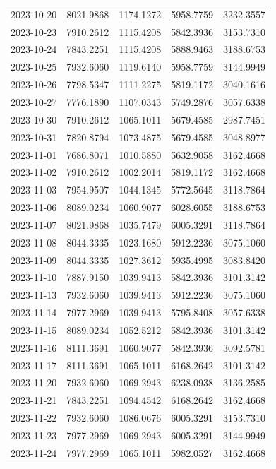 \begin{footnotesize}
\begin{longtable}{lllll}
2023-10-20 & 8021.9868 & 1174.1272 & 5958.7759 & 3232.3557 \\
2023-10-23 & 7910.2612 & 1115.4208 & 5842.3936 & 3153.7310 \\
2023-10-24 & 7843.2251 & 1115.4208 & 5888.9463 & 3188.6753 \\
2023-10-25 & 7932.6060 & 1119.6140 & 5958.7759 & 3144.9949 \\
2023-10-26 & 7798.5347 & 1111.2275 & 5819.1172 & 3040.1616 \\
2023-10-27 & 7776.1890 & 1107.0343 & 5749.2876 & 3057.6338 \\
2023-10-30 & 7910.2612 & 1065.1011 & 5679.4585 & 2987.7451 \\
2023-10-31 & 7820.8794 & 1073.4875 & 5679.4585 & 3048.8977 \\
2023-11-01 & 7686.8071 & 1010.5880 & 5632.9058 & 3162.4668 \\
2023-11-02 & 7910.2612 & 1002.2014 & 5819.1172 & 3162.4668 \\
2023-11-03 & 7954.9507 & 1044.1345 & 5772.5645 & 3118.7864 \\
2023-11-06 & 8089.0234 & 1060.9077 & 6028.6055 & 3188.6753 \\
2023-11-07 & 8021.9868 & 1035.7479 & 6005.3291 & 3118.7864 \\
2023-11-08 & 8044.3335 & 1023.1680 & 5912.2236 & 3075.1060 \\
2023-11-09 & 8044.3335 & 1027.3612 & 5935.4995 & 3083.8420 \\
2023-11-10 & 7887.9150 & 1039.9413 & 5842.3936 & 3101.3142 \\
2023-11-13 & 7932.6060 & 1039.9413 & 5912.2236 & 3075.1060 \\
2023-11-14 & 7977.2969 & 1039.9413 & 5795.8408 & 3057.6338 \\
2023-11-15 & 8089.0234 & 1052.5212 & 5842.3936 & 3101.3142 \\
2023-11-16 & 8111.3691 & 1060.9077 & 5842.3936 & 3092.5781 \\
2023-11-17 & 8111.3691 & 1065.1011 & 6168.2642 & 3101.3142 \\
2023-11-20 & 7932.6060 & 1069.2943 & 6238.0938 & 3136.2585 \\
2023-11-21 & 7843.2251 & 1094.4542 & 6168.2642 & 3162.4668 \\
2023-11-22 & 7932.6060 & 1086.0676 & 6005.3291 & 3153.7310 \\
2023-11-23 & 7977.2969 & 1069.2943 & 6005.3291 & 3144.9949 \\
2023-11-24 & 7977.2969 & 1065.1011 & 5982.0527 & 3162.4668 \\

\end{longtable}
\end{footnotesize}
